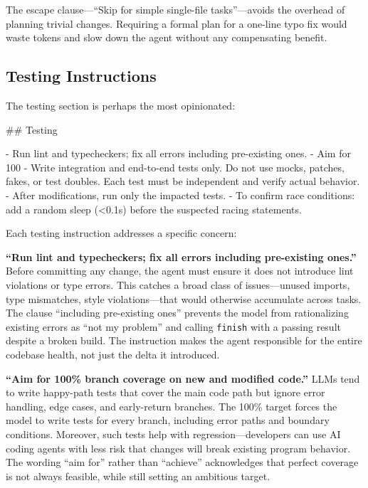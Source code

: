 \documentclass{article}
\begin{document}
\noindent The escape clause---``Skip for simple single-file tasks''---avoids the overhead of planning trivial changes.  Requiring a formal plan for a one-line typo fix would waste tokens and slow down the agent without any compensating benefit.

\subsection{Testing Instructions}

The testing section is perhaps the most opinionated:

\begin{prompt}
## Testing

- Run lint and typecheckers; fix all errors including
  pre-existing ones.
- Aim for 100%
- Write integration and end-to-end tests only. Do not
  use mocks, patches, fakes, or test doubles. Each test
  must be independent and verify actual behavior.
- After modifications, run only the impacted tests.
- To confirm race conditions: add a random sleep (<0.1s)
  before the suspected racing statements.
\end{prompt}

\noindent Each testing instruction addresses a specific concern:

\textbf{``Run lint and typecheckers; fix all errors including pre-existing ones.''}  Before committing any change, the agent must ensure it does not introduce lint violations or type errors.  This catches a broad class of issues---unused imports, type mismatches, style violations---that would otherwise accumulate across tasks.  The clause ``including pre-existing ones'' prevents the model from rationalizing existing errors as ``not my problem'' and calling \texttt{finish} with a passing result despite a broken build.  The instruction makes the agent responsible for the entire codebase health, not just the delta it introduced.

\textbf{``Aim for 100\% branch coverage on new and modified code.''}  LLMs tend to write happy-path tests that cover the main code path but ignore error handling, edge cases, and early-return branches.  The 100\% target forces the model to write tests for every branch, including error paths and boundary conditions.  Moreover, such tests help with regression---developers can use AI coding agents with less risk that changes will break existing program behavior.  The wording ``aim for'' rather than ``achieve'' acknowledges that perfect coverage is not always feasible, while still setting an ambitious target.
\end{document}
